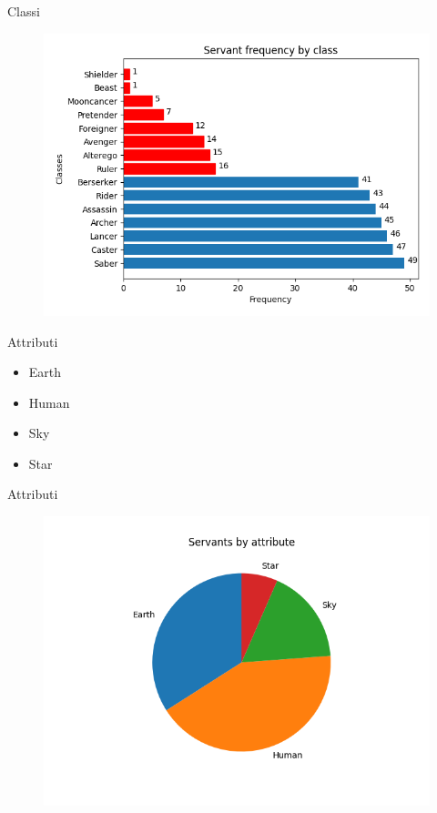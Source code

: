 \documentclass{beamer}
\begin{document}
\begin{darkframes}
  \begin{frame}{Classi}
    \begin{figure}
      \centering
      \includegraphics[scale=0.55]{./images/frequency_by_class.png}
    \end{figure}
  \end{frame}

  \begin{frame}{Attributi}
    \begin{itemize}
      \item Earth
      \item Human
      \item Sky
      \item Star
    \end{itemize}
  \end{frame}

  \begin{frame}{Attributi}
    \begin{figure}
      \centering
      \includegraphics[scale=0.55]{./images/frequency_by_attribute.png}
    \end{figure}
  \end{frame}


\end{darkframes}
\end{document}
